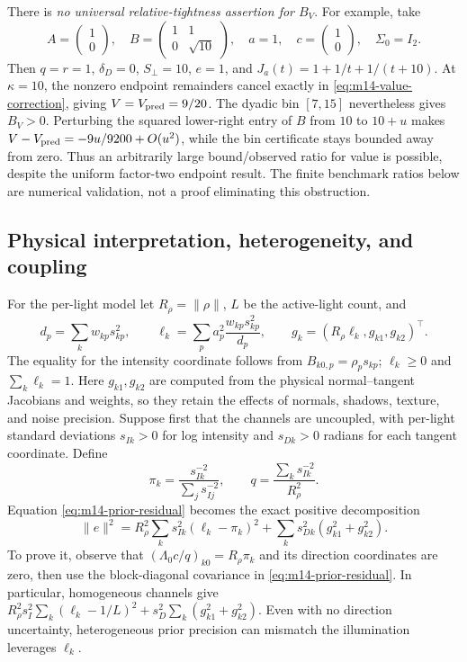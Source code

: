 There is \emph{no universal relative-tightness assertion for $B_V$}.
For example, take
\[
 A=\begin{pmatrix}1\\0\end{pmatrix},\quad
 B=\begin{pmatrix}1&1\\0&\sqrt{10}\end{pmatrix},\quad
 a=1,\quad c=\begin{pmatrix}1\\0\end{pmatrix},\quad\Sigma_0=I_2.
\]
Then $q=r=1$, $\delta_D=0$, $S_\perp=10$, $e=1$, and
$J_a(t)=1+1/t+1/(t+10)$.  At $\kappa=10$, the nonzero endpoint remainders
cancel exactly in \eqref{eq:m14-value-correction}, giving
$V=V_{\rm pred}=9/20$.  The dyadic bin $[7,15]$ nevertheless gives $B_V>0$.
Perturbing the squared lower-right entry of $B$ from $10$ to $10+u$ makes
$V-V_{\rm pred}=-9u/9200+O(u^2)$, while the bin certificate stays bounded
away from zero.  Thus an arbitrarily large bound/observed ratio for value
is possible, despite the uniform factor-two endpoint result.  The finite
benchmark ratios below are numerical validation, not a proof eliminating
this obstruction.

\subsection{Physical interpretation, heterogeneity, and coupling}
\label{subsec:m14-physical}

For the per-light model let $R_\rho=\|\rho\|$, $L$ be the active-light count,
and
\[
 d_p=\sum_k w_{kp}s_{kp}^2,\qquad
 \ell_k=\sum_p a_p^2\frac{w_{kp}s_{kp}^2}{d_p},\qquad
 g_k=(R_\rho\ell_k,g_{k1},g_{k2})^\top.
\]
The equality for the intensity coordinate follows from
$B_{k0,p}=\rho_p s_{kp}$; $\ell_k\geq0$ and $\sum_k\ell_k=1$.
Here $g_{k1},g_{k2}$ are computed from the physical normal--tangent
Jacobians and weights, so they retain the effects of normals, shadows,
texture, and noise precision.  Suppose first that the channels are uncoupled,
with per-light standard deviations $s_{Ik}>0$ for log intensity and
$s_{Dk}>0$ radians for each tangent coordinate.  Define
\begin{equation}
 \pi_k=\frac{s_{Ik}^{-2}}{\sum_j s_{Ij}^{-2}},\qquad
 q=\frac{\sum_k s_{Ik}^{-2}}{R_\rho^2}.
\end{equation}
Equation \eqref{eq:m14-prior-residual} becomes the exact positive decomposition
\begin{equation}
 \|e\|^2=
 R_\rho^2\sum_k s_{Ik}^2(\ell_k-\pi_k)^2
 +\sum_k s_{Dk}^2(g_{k1}^2+g_{k2}^2).
 \label{eq:m14-uncoupled-physical}
\end{equation}
To prove it, observe that $(\Lambda_0c/q)_{k0}=R_\rho\pi_k$ and its
direction coordinates are zero, then use the block-diagonal covariance
in \eqref{eq:m14-prior-residual}.  In particular, homogeneous channels give
$R_\rho^2s_I^2\sum_k(\ell_k-1/L)^2+
 s_D^2\sum_k(g_{k1}^2+g_{k2}^2)$.
Even with no direction uncertainty, heterogeneous prior precision can
mismatch the illumination leverages $\ell_k$.

